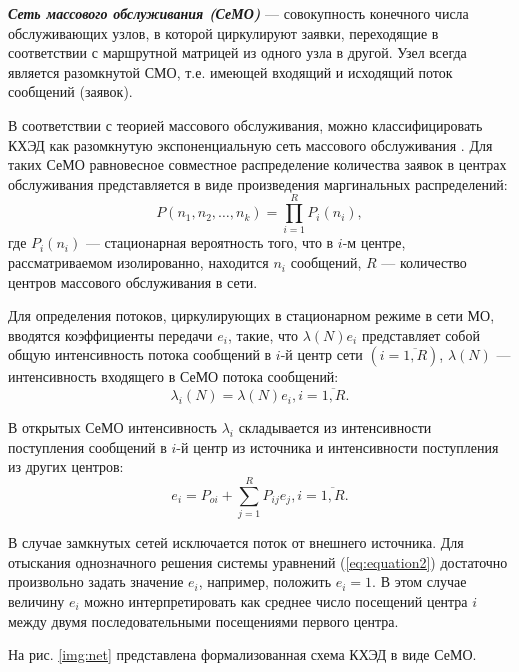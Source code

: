 \vspace{\baselineskip}
\textbf{\textit{Сеть массового обслуживания (СеМО)}} --- совокупность конечного числа обслуживающих узлов, в которой циркулируют заявки, переходящие в соответствии с маршрутной матрицей из одного узла в другой. Узел всегда является разомкнутой СМО, т.е. имеющей входящий и исходящий поток сообщений (заявок).

\vspace{\baselineskip}
В соответствии с теорией массового обслуживания, можно классифицировать КХЭД как разомкнутую экспоненциальную сеть массового обслуживания \cite{bykov}. Для таких СеМО равновесное совместное распределение количества заявок в центрах обслуживания представляется в виде произведения маргинальных распределений:
\begin{equation}
  \label{eq:equation1}
  P(n_1,n_2,\ldots,n_k) = \prod_{i=1}^R P_i(n_i),
\end{equation}
где $P_i(n_i)$ --- стационарная вероятность того, что в $i$-м центре, рассматриваемом изолированно, находится  $n_i$ сообщений, $R$ --- количество центров массового обслуживания в сети.

\vspace{\baselineskip}
Для определения потоков, циркулирующих в стационарном режиме в сети МО, вводятся коэффициенты передачи  $e_i$, такие, что $\lambda(N)e_i$ представляет собой общую интенсивность потока сообщений в $i$-й центр сети $(i=\overline{1,R})$, $\lambda(N)$ --- интенсивность входящего в СеМО потока сообщений:
$$
\lambda_i(N)=\lambda(N)e_i, i=\overline{1,R}.
$$

В открытых СеМО интенсивность  $\lambda_i$ складывается из интенсивности поступления сообщений в $i$-й центр из источника и интенсивности поступления из других центров:
\begin{equation}
  \label{eq:equation2}
e_i = P_{oi} + \sum_{j=1}^R P_{ij}e_j, i=\overline{1,R}.
\end{equation}

В случае замкнутых сетей исключается поток от внешнего источника. Для отыскания однозначного решения системы уравнений (\ref{eq:equation2}) достаточно произвольно задать значение $e_i$, например, положить $e_i=1$. В этом случае величину $e_i$ можно интерпретировать как среднее число посещений центра $i$ между двумя последовательными посещениями первого центра.

\vspace{\baselineskip}
На рис. \ref{img:net} представлена формализованная схема КХЭД в виде СеМО.

